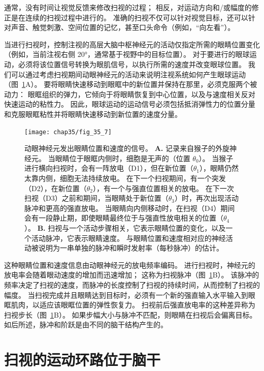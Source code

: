 通常，没有时间让视觉反馈来修改扫视的过程；
相反，对运动方向和/或幅度的修正是在连续的扫视过程中进行的。
准确的扫视不仅可以针对视觉目标，还可以针对声音、触觉刺激、空间位置的记忆，甚至口头命令（例如，“向左看”）。


当进行扫视时，控制注视的高层大脑中枢神经元的活动仅指定所需的眼睛位置变化（例如，当前注视右侧 20°，通常基于视野中的目标位置）。
对于要进行的眼球运动，必须将该位置信号转换为眼肌信号，以执行所需的速度并改变眼球位置。
我们可以通过考虑扫视期间动眼神经元的活动来说明注视系统如何产生眼球运动（图~\ref{fig:35_7}A）。
要将眼睛快速移动到眼眶中的新位置并保持在那里，必须克服两个被动力：
眼眶组织的弹力，它倾向于将眼睛恢复到中心位置，以及与速度相关反对快速运动的粘性力。
因此，眼球运动的运动信号必须包括抵消弹性力的位置分量和克服眼眶粘性并将眼睛快速移动到新位置的速度分量。


\begin{figure}[htbp]
	\centering
	\texttt{[image: chap35/fig\_35\_7]}
	\caption{动眼神经元发出眼睛位置和速度的信号。
		\textbf{A.} 记录来自猴子的外旋神经元。
		当眼睛位于眼眶内侧时，细胞是无声的（位置 $ \theta_0 $）。
		当猴子进行横向扫视时，会有一阵放电（D1），但在新位置（$ \theta_1 $），眼睛仍然太靠内侧，细胞无法持续放电。
		在下一个扫视期间，有一个突发（D2），在新位置（$ \theta_2 $），有一个与强直位置相关的放电。
		在下一次扫视（D3）之前和期间，当眼睛处于新位置（$ \theta_3 $）时，再次出现活动脉冲和更高的强直放电。
		当眼睛向内侧移动时，在扫视（D4）期间会有一段静止期，即使眼睛最终位于与强直性放电相关的位置（$ \theta_4 $）\cite{fuchs1970firing}。
		\textbf{B.} 扫视与一个活动步骤相关，它表示眼睛位置的变化，以及一个活动脉冲，它表示眼睛速度。
		与眼睛位置和速度相对应的神经活动被说明为一串单独的脉冲和瞬时发射率（每秒脉冲）的估计。}
	\label{fig:35_7}
\end{figure}


这种眼睛位置和速度信息由动眼神经元的放电频率编码。
进行扫视时，神经元的放电率会随着眼动速度的增加而迅速增加；
这称为扫视脉冲（图~\ref{fig:35_7}B）。
该脉冲的频率决定了扫视的速度，而脉冲的长度控制了扫视的持续时间，从而控制了扫视的幅度。
当扫视完成并且眼睛达到目标时，必须有一个新的强直输入水平输入到眼眶肌肉，以适应该眼眶位置的弹性恢复力。
扫视前后强直放电率的这种差异称为扫视步长（图~\ref{fig:35_7}B）。
如果步幅大小与脉冲不匹配，则眼睛在扫视后会偏离目标。
如后所述，脉冲和阶跃是由不同的脑干结构产生的。



\section{扫视的运动环路位于脑干}

